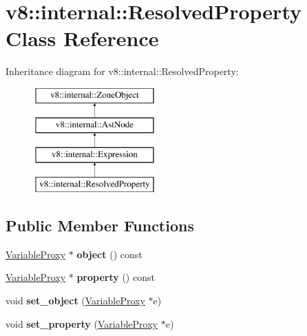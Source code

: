 \hypertarget{classv8_1_1internal_1_1ResolvedProperty}{}\section{v8\+:\+:internal\+:\+:Resolved\+Property Class Reference}
\label{classv8_1_1internal_1_1ResolvedProperty}
Inheritance diagram for v8\+:\+:internal\+:\+:Resolved\+Property\+:\begin{figure}[H]
\begin{center}
\leavevmode
\includegraphics[height=4.000000cm]{classv8_1_1internal_1_1ResolvedProperty}
\end{center}
\end{figure}
\subsection*{Public Member Functions}
\begin{DoxyCompactItemize}
\item 
\mbox{\label{classv8_1_1internal_1_1ResolvedProperty_a7b555b291a52f9f724bff880cb67d2e8}} 
\mbox{\hyperlink{classv8_1_1internal_1_1VariableProxy}{Variable\+Proxy}} $\ast$ {\bfseries object} () const
\item 
\mbox{\label{classv8_1_1internal_1_1ResolvedProperty_ae4af355612ddaf7d0da5f520dc7ae72f}} 
\mbox{\hyperlink{classv8_1_1internal_1_1VariableProxy}{Variable\+Proxy}} $\ast$ {\bfseries property} () const
\item 
\mbox{\label{classv8_1_1internal_1_1ResolvedProperty_aabe0ed1ef5d780ecffe72c5f6118310d}} 
void {\bfseries set\+\_\+object} (\mbox{\hyperlink{classv8_1_1internal_1_1VariableProxy}{Variable\+Proxy}} $\ast$e)
\item 
\mbox{\label{classv8_1_1internal_1_1ResolvedProperty_a32092198c489224da59aef10245d0951}} 
void {\bfseries set\+\_\+property} (\mbox{\hyperlink{classv8_1_1internal_1_1VariableProxy}{Variable\+Proxy}} $\ast$e)
\end{DoxyCompactItemize}
